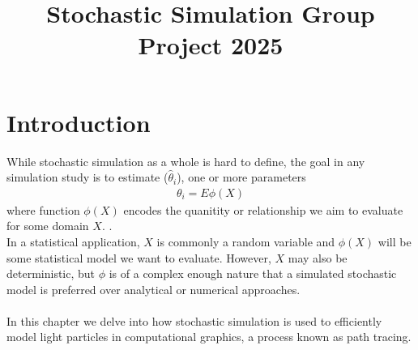 \documentclass{article}
\title{\vspace{-4cm}Stochastic Simulation Group Project 2025}
\begin{document}
\maketitle

\section{Introduction}
While stochastic simulation as a whole is hard to define,
the goal in any simulation study is to estimate ($\hat{\theta}_i$), one or more parameters 
\begin{align}
    \theta_i = E\phi(X) \label{eq: expectation of loss function}
\end{align} 
where function $\phi(X)$ encodes the quanitity or relationship we aim to evaluate 
for some domain $X$. \cite{alma9946168020001381}.
\\
In a statistical application, $X$ is commonly a random variable and $\phi(X)$ will be
some statistical model we want to evaluate.
However, $X$ may also be deterministic, but $\phi$ is of a complex enough nature
that a simulated stochastic model is preferred over analytical or numerical approaches.
\\ \\
In this chapter we delve into how stochastic simulation is used to efficiently model
light particles in computational graphics, a process known as path tracing.
\end{document}

